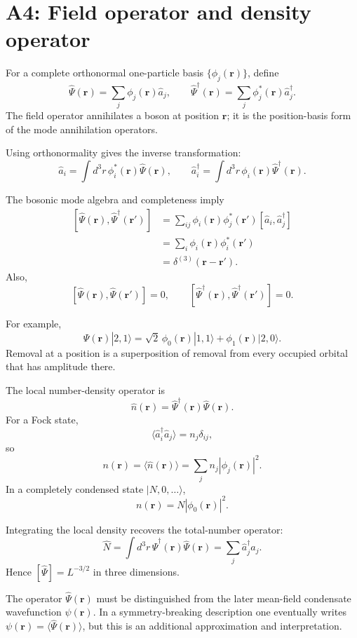 \section{A4: Field operator and density operator}

For a complete orthonormal one-particle basis $\{\phi_j(\mathbf r)\}$, define
\[
\boxed{
\hat\Psi(\mathbf r)=\sum_j\phi_j(\mathbf r)\hat a_j,
\qquad
\hat\Psi^\dagger(\mathbf r)
=\sum_j\phi_j^*(\mathbf r)\hat a_j^\dagger.
}
\]
The field operator annihilates a boson at position $\mathbf r$; it is the
position-basis form of the mode annihilation operators.

Using orthonormality gives the inverse transformation:
\[
\boxed{
\hat a_i=\int d^3r\,\phi_i^*(\mathbf r)\hat\Psi(\mathbf r),
\qquad
\hat a_i^\dagger=\int d^3r\,\phi_i(\mathbf r)
\hat\Psi^\dagger(\mathbf r).
}
\]

The bosonic mode algebra and completeness imply
\[
\begin{aligned}
[\hat\Psi(\mathbf r),\hat\Psi^\dagger(\mathbf r')]
&=\sum_{ij}\phi_i(\mathbf r)\phi_j^*(\mathbf r')
[\hat a_i,\hat a_j^\dagger]\\
&=\sum_i\phi_i(\mathbf r)\phi_i^*(\mathbf r')\\
&=\delta^{(3)}(\mathbf r-\mathbf r').
\end{aligned}
\]
Also,
\[
[\hat\Psi(\mathbf r),\hat\Psi(\mathbf r')]=0,
\qquad
[\hat\Psi^\dagger(\mathbf r),\hat\Psi^\dagger(\mathbf r')]=0.
\]

For example,
\[
\hat\Psi(\mathbf r)|2,1\rangle
=\sqrt2\,\phi_0(\mathbf r)|1,1\rangle
+\phi_1(\mathbf r)|2,0\rangle.
\]
Removal at a position is a superposition of removal from every occupied
orbital that has amplitude there.

The local number-density operator is
\[
\boxed{
\hat n(\mathbf r)
=\hat\Psi^\dagger(\mathbf r)\hat\Psi(\mathbf r).
}
\]
For a Fock state,
\[
\langle\hat a_i^\dagger\hat a_j\rangle
=n_j\delta_{ij},
\]
so
\[
\boxed{
n(\mathbf r)=\langle\hat n(\mathbf r)\rangle
=\sum_jn_j|\phi_j(\mathbf r)|^2.
}
\]
In a completely condensed state $|N,0,\ldots\rangle$,
\[
n(\mathbf r)=N|\phi_0(\mathbf r)|^2.
\]

Integrating the local density recovers the total-number operator:
\[
\boxed{
\hat N=\int d^3r\,
\hat\Psi^\dagger(\mathbf r)\hat\Psi(\mathbf r)
=\sum_j\hat a_j^\dagger\hat a_j.
}
\]
Hence $[\hat\Psi]=L^{-3/2}$ in three dimensions.

The operator $\hat\Psi(\mathbf r)$ must be distinguished from the later
mean-field condensate wavefunction $\psi(\mathbf r)$. In a symmetry-breaking
description one eventually writes
$\psi(\mathbf r)=\langle\hat\Psi(\mathbf r)\rangle$, but this is an
additional approximation and interpretation.
